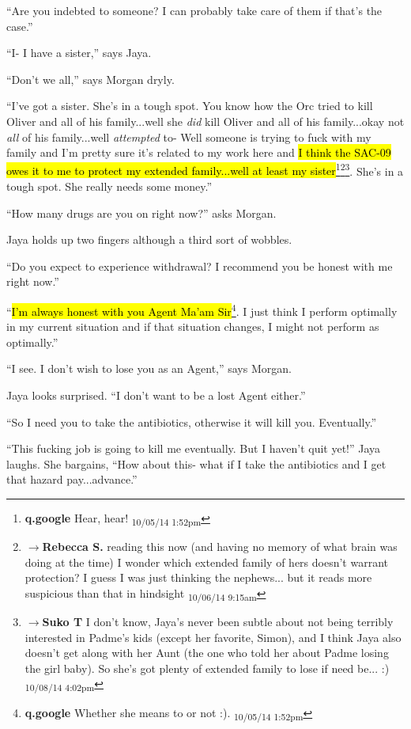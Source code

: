 ``Are you indebted to someone?  I can probably take care of them if that's the case.''

``I- I have a sister,'' says Jaya.

``Don't we all,'' says Morgan dryly.

``I've got a sister.  She's in a tough spot.  You know how the Orc tried to kill Oliver and all of his family...well she \textit{did} kill Oliver and all of his family...okay not \textit{all} of his family...well \textit{attempted} to-  Well someone is trying to fuck with my family and I'm pretty sure it's related to my work here and \hl{I think the SAC-09 owes it to me to protect my extended family...well at least my sister}\footnote{\textbf{q.google }Hear, hear! \textsubscript{10/05/14 1:52pm}}\footnote{$\rightarrow$\textbf{Rebecca S. }reading this now (and having no memory of what brain was doing at the time) I wonder which extended family of hers doesn't warrant protection?  I guess I was just thinking the nephews... but it reads more suspicious than that in hindsight \textsubscript{10/06/14 9:15am}}\footnote{$\rightarrow$\textbf{Suko T }I don't know, Jaya's never been subtle about not being terribly interested in Padme's kids (except her favorite, Simon), and I think Jaya also doesn't get along with her Aunt (the one who told her about Padme losing the girl baby).  So she's got plenty of extended family to lose if need be... :) \textsubscript{10/08/14 4:02pm}}.  She's in a tough spot.  She really needs some money.''

``How many drugs are you on right now?'' asks Morgan.

Jaya holds up two fingers although a third sort of wobbles.

``Do you expect to experience withdrawal?  I recommend you be honest with me right now.''

``\hl{I'm always honest with you Agent Ma'am Sir}\footnote{\textbf{q.google }Whether she means to or not :). \textsubscript{10/05/14 1:52pm}}.  I just think I perform optimally in my current situation and if that situation changes, I might not perform as optimally.''

``I see.  I don't wish to lose you as an Agent,'' says Morgan.

Jaya looks surprised.  ``I don't want to be a lost Agent either.''

``So I need you to take the antibiotics, otherwise it will kill you.  Eventually.''

``This fucking job is going to kill me eventually.  But I haven't quit yet!'' Jaya laughs.  She bargains, ``How about this- what if I take the antibiotics and I get that hazard pay...advance.''

